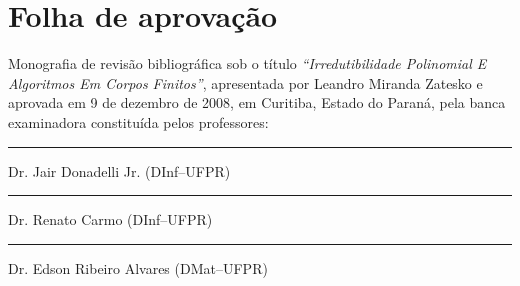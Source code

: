 
\chapter*{Folha de aprovação}

Monografia de revisão bibliográfica sob o título
\textsl{``Irredutibilidade Polinomial E Algoritmos
Em Corpos Finitos''}, apresentada
por Leandro Miranda Zatesko
e aprovada em 9 de dezembro de 2008, em Curitiba,
Estado do Paraná, pela banca examinadora constituída pelos professores:


\noindent
{}
\rule{3in}{1pt}

\noindent
{}
Dr. Jair Donadelli Jr. (DInf--UFPR)


\noindent
{}
\rule{3in}{1pt}

\noindent
{}
Dr. Renato Carmo (DInf--UFPR)


\noindent
{}
\rule{3in}{1pt}

\noindent
{}
Dr. Edson Ribeiro Alvares (DMat--UFPR)



